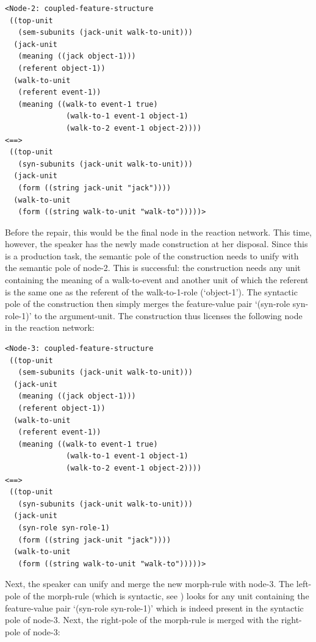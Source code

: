 \ea
\begin{lstlisting}
<Node-2: coupled-feature-structure
 ((top-unit
   (sem-subunits (jack-unit walk-to-unit)))
  (jack-unit
   (meaning ((jack object-1)))
   (referent object-1))
  (walk-to-unit
   (referent event-1))
   (meaning ((walk-to event-1 true)
              (walk-to-1 event-1 object-1)
              (walk-to-2 event-1 object-2))))
<==>
 ((top-unit
   (syn-subunits (jack-unit walk-to-unit)))
  (jack-unit
   (form ((string jack-unit "jack"))))
  (walk-to-unit
   (form ((string walk-to-unit "walk-to")))))>
\end{lstlisting}
\z


Before the repair, this would be the final node in the reaction network. This time, however, the speaker has the newly made construction at her disposal. Since this is a production task, the semantic pole of the construction needs to unify with the semantic pole of node-2. This is successful: the construction needs any unit containing the meaning of a walk-to-event and another unit of which the referent is the same one as the referent of the walk-to-1-role (`object-1'). The syntactic pole of the construction then simply merges the feature-value pair `(syn-role syn-role-1)' to the argument-unit. The construction thus licenses the following node in the reaction network:


\ea
\begin{lstlisting}
<Node-3: coupled-feature-structure
 ((top-unit
   (sem-subunits (jack-unit walk-to-unit)))
  (jack-unit
   (meaning ((jack object-1)))
   (referent object-1))
  (walk-to-unit
   (referent event-1))
   (meaning ((walk-to event-1 true)
              (walk-to-1 event-1 object-1)
              (walk-to-2 event-1 object-2))))
<==>
 ((top-unit
   (syn-subunits (jack-unit walk-to-unit)))
  (jack-unit
   (syn-role syn-role-1)
   (form ((string jack-unit "jack"))))
  (walk-to-unit
   (form ((string walk-to-unit "walk-to")))))>
\end{lstlisting}
\z



Next, the speaker can unify and merge the new morph-rule with node-3. The left-pole of the morph-rule (which is syntactic, see ) looks for any unit containing the feature-value pair `(syn-role syn-role-1)' which is indeed present in the syntactic pole of node-3. Next, the right-pole of the morph-rule is merged with the right-pole of node-3:


